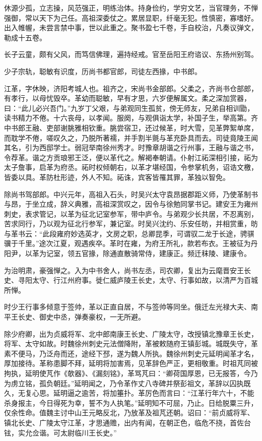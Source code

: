 \documentclass[12pt,UTF8]{ctexbook}
\begin{document}
休源少孤，立志操，风范强正，明练治体。持身俭约，学穷文艺，当官理务，不惮强御，常以天下为己任。高祖深委仗之。累居显职，纤毫无犯。性慎密，寡嗜好。出入帷幄，未尝言禁中事，世以此重之。聚书盈七千卷，手自校治，凡奏议弹文，勒成十五卷。

长子云童，颇有父风，而笃信佛理，遍持经戒。官至岳阳王府谘议、东扬州别驾。

少子宗轨，聪敏有识度，历尚书都官郎，司徒左西掾，中书郎。

江革，字休映，济阳考城人也。祖齐之，宋尚书金部郎。父柔之，齐尚书仓部郎，有孝行，以母忧毁卒。革幼而聪敏，早有才思，六岁便解属文。柔之深加赏器，曰：“此儿必兴吾门。”九岁丁父艰，与弟观同生孤贫，傍无师友，兄弟自相训勖，读书精力不倦。十六丧母，以孝闻。服阕，与观俱诣太学，补国子生，举高第。齐中书郎王融、吏部谢朓雅相钦重。朓尝宿卫，还过候革，时大雪，见革弊絮单席，而耽学不倦，嗟叹久之，乃脱所著襦，并手割半氈与革充卧具而去。司徒竟陵王闻其名，引为西邸学士。弱冠举南徐州秀才。时豫章胡谐之行州事，王融与谐之书，令荐革。谐之方贡琅邪王泛，便以革代之。解褐奉朝请。仆射江祏深相引接，祏为太子詹事，启革为府丞。祏时权倾朝右，以革才堪经国，令参掌机务，诏诰文檄，皆委以具。革防杜形迹，外人不知。祏诛，宾客皆罹其罪，革独以智免。

除尚书驾部郎。中兴元年，高祖入石头，时吴兴太守袁昂据郡距义师，乃使革制书与昂，于坐立成，辞义典雅，高祖深赏叹之，因令与徐勉同掌书记。建安王为雍州刺史，表求管记，以革为征北记室参军，带中庐令。与弟观少长共居，不忍离别，苦求同行，乃以观为征北行参军，兼记室。时吴兴沈约、乐安任昉，并相赏重，昉与革书云：“此段雍府妙选英才，文房之职，总卿昆季，可谓驭二龙于长途，骋骐骥于千里。”途次江夏，观遇疾卒。革时在雍，为府王所礼，款若布衣。王被征为丹阳尹，以革为记室，领五官掾，除通直散骑常侍，建康正。频迁秣陵、建康令。

为治明肃，豪强惮之。入为中书舍人，尚书左丞，司农卿，复出为云麾晋安王长史、寻阳太守、行江州府事。徙仁威庐陵王长史，太守、行事如故，以清严为百城所惮。

时少王行事多倾意于签帅，革以正直自居，不与签帅等同坐。俄迁左光禄大夫、南平王长史、御史中丞，弹奏豪权，一无所避。

除少府卿，出为贞威将军、北中郎南康王长史、广陵太守，改授镇北豫章王长史，将军、太守如故。时魏徐州刺史元法僧降附，革被敕随府王镇彭城。城既失守，革素不便马，乃泛舟而还，途经下邳，遂为魏人所执。魏徐州刺史元延明闻革才名，厚加接待。革称患脚不拜，延明将加害焉，见革辞色严正，更相敬重。时祖芃同被拘执，延明使芃作《欹器》、《漏刻铭》，革骂芃曰：“卿荷国厚恩，已无报答，今乃为虏立铭，孤负朝廷。”延明闻之，乃令革作丈八寺碑并祭彭祖文，革辞以囚执既久，无复心思。延明逼之逾苦，将加箠扑。革厉色而言曰：“江革行年六十，不能杀身报主，今日得死为幸，誓不为人执笔。”延明知不可屈，乃止。日给脱粟三升，仅余性命。值魏主讨中山王元略反北，乃放革及祖芃还朝。诏曰：“前贞威将军、镇北长史、广陵太守江革，才思通赡，出内有闻，在朝正色，临危不挠，首佐台铉，实允佥谐。可太尉临川王长史。”
\end{document}
